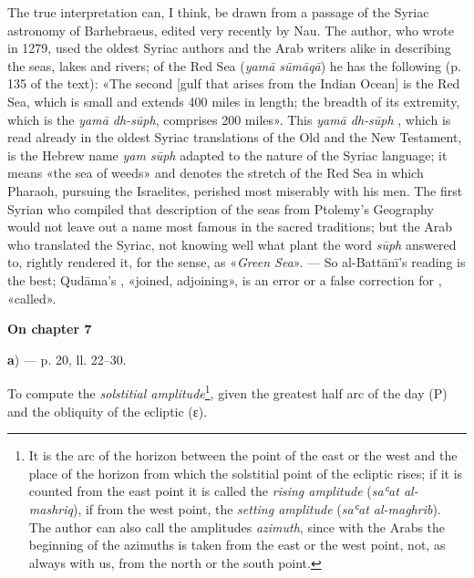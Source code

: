 \documentclass[11pt]{article}
\newcommand{\UnitHead}[2]{\par\setcounter{footnoteT}{0}\needspace{8\baselineskip}\bigskip\pdfbookmark[1]{#1}{unit-#2}\hypertarget{EN-#2}{}%
 {\large\bfseries\interlinepenalty=10000 #1\par}\nobreak\medskip}
\begin{document}
\par The true interpretation can, I think, be drawn from a passage of the Syriac astronomy of Barhebraeus, edited very recently by Nau. The author, who wrote in 1279, used the oldest Syriac authors and the Arab writers alike in describing the seas, lakes and rivers; of the Red Sea (\emph{yamā sūmāqā}) he has the following (p. 135 of the text): «The second [gulf that arises from the Indian Ocean] is the Red Sea, which is small and extends 400 miles in length; the breadth of its extremity, which is the \emph{yamā dh-sūph}, comprises 200 miles». This \emph{yamā dh-sūph} , which is read already in the oldest Syriac translations of the Old and the New Testament, is the Hebrew name \emph{yam sūph} adapted to the nature of the Syriac language; it means «the sea of weeds» and denotes the stretch of the Red Sea in which Pharaoh, pursuing the Israelites, perished most miserably with his men. The first Syrian who compiled that description of the seas from Ptolemy's Geography would not leave out a name most famous in the sacred traditions; but the Arab who translated the Syriac, not knowing well what plant the word \emph{sūph} answered to, rightly rendered it, for the sense, as «\emph{Green Sea}». — So al-Battānī's reading is the best; Qudāma's , «joined, adjoining», is an error or a false correction for , «called».\par
\UnitHead{On chapter 7}{A07}
\par\begin{center}\textbf{a}) — p. 20, ll. 22–30.\end{center}
\begin{center}\end{center}
\par To compute the \emph{solstitial amplitude}\footnote{It is the arc of the horizon between the point of the east or the west and the place of the horizon from which the solstitial point of the ecliptic rises; if it is counted from the east point it is called the \emph{rising amplitude} (\emph{saʿat al-mashriq}), if from the west point, the \emph{setting amplitude} (\emph{saʿat al-maghrib}). The author can also call the amplitudes \emph{azimuth}, since with the Arabs the beginning of the azimuths is taken from the east or the west point, not, as always with us, from the north or the south point.}, given the greatest half arc of the day (P) and the obliquity of the ecliptic ({\greekfont ε}).\par
\end{document}
